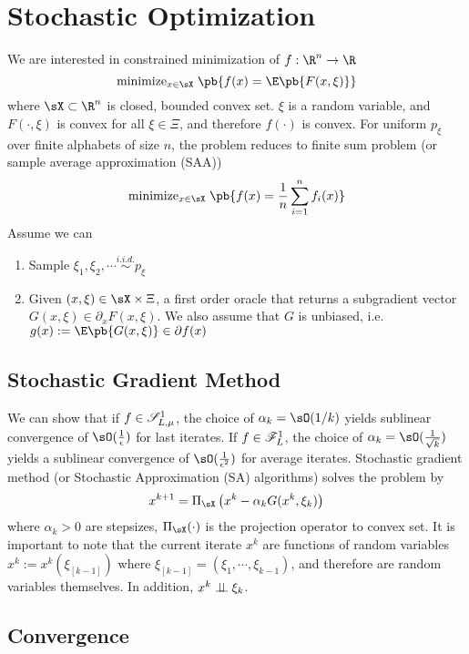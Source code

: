 \documentclass[../summary.tex]{subfiles}
\begin{document}
\section{Stochastic Optimization}
We are interested in constrained minimization of $f:\R^n\to\R$ 
\[
    \text{minimize}_{x\in\sX}\; \pb{
        f(x) = \E\pb{F(x,\xi)}
    }
\]
where $\sX \subset \R^n$ is closed, bounded convex set. $\xi$ is a random variable, and $F(\cdot,\xi)$ is convex for all $\xi\in\Xi$, and therefore $f(\cdot)$ is convex. For uniform $p_{\xi}$ over finite alphabets of size $n$, the problem reduces to finite sum problem (or sample average approximation (SAA))
\[
    \text{minimize}_{x\in\sX}\; \pb{
        f(x) = \frac{1}{n} \sum_{i=1}^n f_i(x)
    }    
\] 
Assume we can
\begin{enumerate}
    \item Sample $\xi_1,\xi_2,\cdots \overset{i.i.d.}{\sim} p_{\xi}$
    \item Given $(x,\xi)\in\sX\times\Xi$, a first order oracle that returns a subgradient vector $G(x,\xi) \in\partial_x F(x,\xi)$. We also assume that $G$ is unbiased, i.e. $g(x) := \E\pb{G(x,\xi)}\in\partial f(x)$
\end{enumerate}

\subsection{Stochastic Gradient Method}


We can show that if $f\in\mathscr{S}_{L,\mu}^1$, the choice of $\alpha_k = \sO(1/k)$ yields sublinear convergence of $\sO(\frac{1}{\epsilon})$ for last iterates. If $f\in\mathscr{F}_{L}^1$, the choice of $\alpha_k=\sO(\frac{1}{\sqrt{k}})$ yields a sublinear convergence of $\sO(\frac{1}{\epsilon^2})$ for average iterates. Stochastic gradient method (or Stochastic Approximation (SA) algorithms) solves the problem by 
\[
    x^{k+1} = \Pi_{\sX}\left( x^k - \alpha_k G(x^k, \xi_k) \right)    
\]
where $\alpha_k > 0$ are stepsizes, $\Pi_{\sX}(\cdot)$ is the projection operator to convex set. It is important to note that the current iterate $x^k$ are functions of random variables $x^k := x^k(\xi_{[k-1]})$ where $\xi_{[k-1]} = (\xi_1,\cdots,\xi_{k-1})$, and therefore are random variables themselves. In addition, $x^k \perp \!\!\! \perp \xi_k$. 

\subsection{Convergence}
\end{document}
